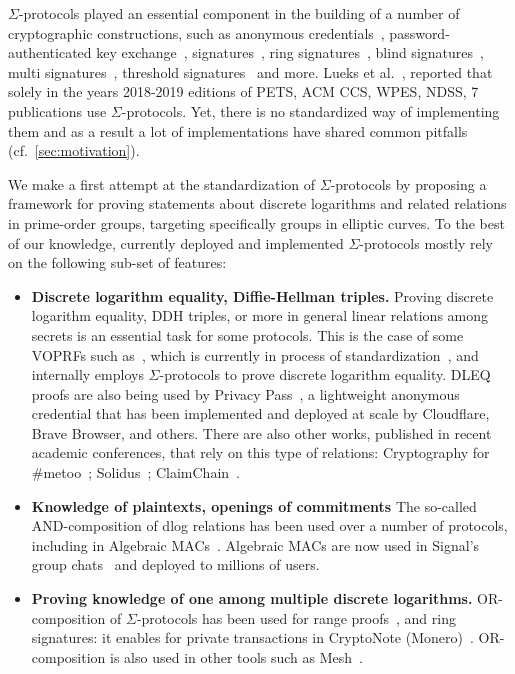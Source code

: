 \documentclass[runningheads]{llncs}
\begin{document}
$\Sigma$-protocols played an essential component in the building of a number of cryptographic
constructions,
such as anonymous credentials~\cite{CCS:ChaMeiZav14}, password-authenticated key exchange~\cite{jpake}, signatures~\cite{C:Schnorr89},
ring signatures~\cite{borromeansig}, blind signatures~\cite{CCS:PoiSte97}, multi signatures~\cite{CCS:NRSW20}, threshold signatures~\cite{EPRINT:KomGol20} and more.
Lueks et al.~\cite{zksk}, reported that solely in the years 2018-2019 editions of PETS, ACM CCS, WPES, NDSS,
7 publications use  $\Sigma$-protocols.
Yet, there is no standardized way of implementing them and as a result a lot of implementations have shared common pitfalls (cf.\ \cref{sec:motivation}).

We make a first attempt at the standardization of $\Sigma$-protocols by proposing a framework for proving statements about discrete logarithms and related relations in prime-order groups, targeting specifically groups in elliptic curves. To the best of our knowledge, currently deployed and implemented $\Sigma$-protocols mostly rely on the following sub-set of features:

\begin{itemize}
  \item \textbf{Discrete logarithm equality, Diffie-Hellman triples.}
  Proving discrete logarithm equality, DDH triples, or more in general linear relations among secrets is an essential task for some protocols. This is the case of some VOPRFs such as~\cite{AC:JarKiaKra14},
  which is currently in process of standardization~\cite{cfrg-voprf}, and internally employs $\Sigma$-protocols to prove discrete logarithm equality.
  DLEQ proofs are also being used by Privacy Pass~\cite{PoPETS:DGSTV18}, a lightweight anonymous credential that has been implemented and deployed at scale by Cloudflare, Brave
  Browser, and others.
  There are also other works, published in recent academic conferences, that rely on this type of relations: Cryptography for \#metoo~\cite{PoPETS:KuyKraRab19}; Solidus~\cite{CCS:CZJKJS17}; ClaimChain~\cite{ClaimChain}.
  \item \textbf{Knowledge of plaintexts, openings of commitments}
  The so-called AND-composition of dlog relations has been used over a number of protocols,
  including in Algebraic MACs~\cite{CCS:ChaMeiZav14}.
  Algebraic MACs are now used in Signal's group chats~\cite{CCS:ChaPerZav20} and deployed to millions of users.
  \item \textbf{Proving knowledge of one among multiple discrete logarithms.}
  OR-composition of $\Sigma$-protocols
  has been used for range proofs~\cite{borromeansig}, and ring signatures: it enables for private transactions in CryptoNote (Monero)~\cite{monero}.
  OR-composition is also used in other tools such as Mesh~\cite{PoPETS:AlTGon19}.
\end{itemize}
\end{document}
